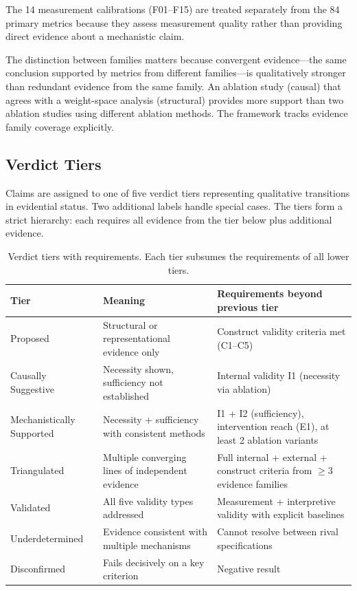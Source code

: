 \documentclass[10pt]{article}
\newcommand{\tighttable}{\setlength{\tabcolsep}{4pt}\renewcommand{\arraystretch}{1.05}}
\begin{document}
The 14 measurement calibrations (F01--F15) are treated separately from the 84 primary metrics because they assess measurement quality rather than providing direct evidence about a mechanistic claim.

The distinction between families matters because convergent evidence---the same conclusion supported by metrics from different families---is qualitatively stronger than redundant evidence from the same family. An ablation study (causal) that agrees with a weight-space analysis (structural) provides more support than two ablation studies using different ablation methods. The framework tracks evidence family coverage explicitly.

\subsection{Verdict Tiers}
\label{sec:verdict-tiers}

Claims are assigned to one of five verdict tiers representing qualitative transitions in evidential status. Two additional labels handle special cases. The tiers form a strict hierarchy: each requires all evidence from the tier below plus additional evidence.

\begin{table}[t]
\centering
\tighttable
\caption{Verdict tiers with requirements. Each tier subsumes the requirements of all lower tiers.}
\label{tab:verdicts}
\small
\begin{tabular}{@{}lp{4.5cm}p{5.5cm}@{}}
\toprule
\textbf{Tier} & \textbf{Meaning} & \textbf{Requirements beyond previous tier} \\
\midrule
Proposed & Structural or representational evidence only & Construct validity criteria met (C1--C5) \\
Causally Suggestive & Necessity shown, sufficiency not established & Internal validity I1 (necessity via ablation) \\
Mechanistically Supported & Necessity + sufficiency with consistent methods & I1 + I2 (sufficiency), intervention reach (E1), at least 2 ablation variants \\
Triangulated & Multiple converging lines of independent evidence & Full internal + external + construct criteria from $\geq 3$ evidence families \\
Validated & All five validity types addressed & Measurement + interpretive validity with explicit baselines \\
\midrule
Underdetermined & Evidence consistent with multiple mechanisms & Cannot resolve between rival specifications \\
Disconfirmed & Fails decisively on a key criterion & Negative result \\
\bottomrule
\end{tabular}
\end{table}
\end{document}
